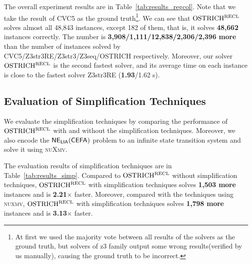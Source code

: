 The overall experiment results are in Table~\ref{tab:results_regcol}. Note that we take the result of CVC5 as the ground truth\footnote{At first we used the majority vote between all results of the solvers as the ground truth, but solvers of z3 family output some wrong results(verified by us manually), causing the ground truth to be incorrect.}. We can see that $\rm OSTRICH^{RECL}$ solves almost all 48,843 instances, except 182 of them, that is, it solves \textbf{48,662} instances correctly. The number is %
\textbf{3,908/1,111/12,838/2,306/2,396 more} than the number of instances solved by CVC5/Z3str3RE/Z3str3/Z3seq/OSTRICH respectively.
%      
%
Moreover, our solver $\rm OSTRICH^{RECL}$ is the second fastest solver, and its average time on each instance is close to the fastest solver Z3str3RE (\textbf{1.93}/1.62 s).
\vspace{-3mm}
\subsection{Evaluation of Simplification Techniques}
\vspace{-2mm}

We evaluate the simplification techniques by comparing the performance of $\rm OSTRICH^{RECL}$ with and without the simplification techniques. Moreover, we also encode the ${\sf NE_{LIA}(CEFA)}$ problem to an infinite state transition system and solve it using \textsc{nuXmv}\cite{nuxmv}. 

The evaluation results of simplification techniques are in Table~\ref*{tab:results_simp}. Compared to $\rm OSTRICH^{RECL}$ without simplification techniques, $\rm OSTRICH^{RECL}$ with simplification techniques solves \textbf{1,503 more} instances and is \textbf{2.21$\times$} faster. Moreover, compared with the techniques using \textsc{nuxmv}, $\rm OSTRICH^{RECL}$ with simplification techniques solves \textbf{1,798 more} instances and is \textbf{3.13$\times$} faster. 

